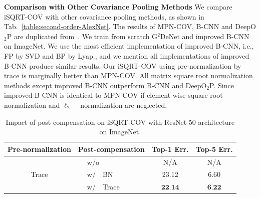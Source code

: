 \documentclass[10pt,twocolumn,letterpaper]{article}
\begin{document}
\vspace{4pt}\noindent\textbf{Comparison with Other Covariance Pooling Methods}\quad 
We compare iSQRT-COV  with other covariance pooling methods, as shown in Tab.~\ref{table:second-order-AlexNet}. The results of MPN-COV, B-CNN and DeepO$_{2}$P are duplicated from~\cite{Li_2017_ICCV}. We train from scratch  G$^2$DeNet and improved B-CNN  on ImageNet. We use the most efficient implementation  of improved B-CNN, i.e., FP by SVD and BP by Lyap., and we mention all implementations of improved B-CNN produce similar results. Our iSQRT-COV using pre-normalization by trace is marginally better than  MPN-COV.  All  matrix square root normalization methods  except improved B-CNN outperform  B-CNN and DeepO$_{2}$P. Since  improved B-CNN is identical to MPN-COV if element-wise square root  normalization and $\ell_{2}-$normalization are neglected, 
\begin{table}[t]
	\setlength\tabcolsep{4pt}
	\renewcommand{\baselinestretch}{1.05}
	\footnotesize
	\centering
	\begin{minipage}[t]{1.0\linewidth}
		\centering
		\begin{tabular}{|c|l|c|c|}
			\hline
			Pre-normalization & Post-compensation & Top-1 Err.   &  Top-5 Err. \\
			\hline
			\hline
			\multirow{3}{*}{Trace} & $\quad\;$w/o       &   N/A    & N/A     \\
			& $\quad\;$w/~~BN~\cite{DBLP:journals/corr/IoffeS15}       &  23.12     & 6.60     \\
			& $\quad\;$w/~~Trace        &  $\textbf{22.14}$ & $\textbf{6.22}$ \\
			\hline
		\end{tabular}
	\end{minipage}
	\renewcommand{\baselinestretch}{1.0}
	\caption{Impact of post-compensation on iSQRT-COV  with  ResNet-50 architecture on ImageNet.}
	\label{table:Post-compensation}
\end{table}
\end{document}

